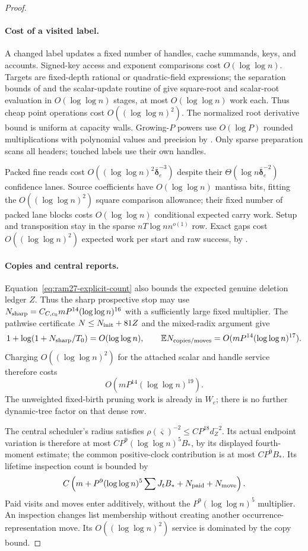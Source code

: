 \documentclass[11pt]{article}
\theoremstyle{remark}
\newcommand{\vvsbar}{\overline{\boldsymbol{\varsigma}}}
\newcommand{\ddeltabar}{\overline{\boldsymbol{\delta}}}
\newcommand{\Ex}{\mathbb E}
\begin{document}
\begin{proof}
\paragraph{Cost of a visited label.}
A changed label updates a fixed number of handles, cache summands, keys, and
accounts.
Signed-key access and exponent comparisons cost $O(\log\log n)$.
Targets are fixed-depth rational or quadratic-field expressions; the separation
bounds of  and the scalar-update routine of
 give square-root and scalar-root evaluation in $O(\log\log n)$
stages, at most $O(\log\log n)$ work each.
Thus cheap point operations cost $O((\log\log n)^2)$.
The normalized root derivative bound is uniform at capacity walls.
Growing-$P$ powers use $O(\log P)$ rounded multiplications with polynomial
values and precision by .
Only sparse preparation scans all headers; touched labels use their own handles.

Packed fine reads cost $O((\log\log n)^2\ddeltabar_e^{-3})$ despite their
$\Theta(\log n\ddeltabar_e^{-2})$ confidence lanes.
Source coefficients have $O(\log\log n)$ mantissa bits, fitting the $O((\log\log n)^2)$ square
comparison allowance; their fixed number of packed lane blocks costs $O(\log\log n)$
conditional expected carry work.
Setup and transposition stay in the sparse $nT\log nn^{o(1)}$ row.
Exact gaps cost $O((\log\log n)^2)$ expected work per start and raw success, by
.

\paragraph{Copies and central reports.}
Equation~\eqref{eq:ram27-explicit-count} also bounds the expected genuine
deletion ledger $Z$.
Thus the sharp prospective stop may use $N_{\rm
sharp}=C_{C,c_0}mP^{14}(\log\log n)^{16}$ with a sufficiently large fixed multiplier.
The pathwise certificate $N\le N_{\rm init}+81Z$ and the mixed-radix argument
give
\[
 1+\log(1+N_{\rm sharp}/T_0)=O(\log\log n),\qquad
 \Ex N_{\rm copies/moves}=O(mP^{14}(\log\log n)^{17}).
\]
Charging $O((\log\log n)^2)$ for the attached scalar and handle service
therefore costs
\[
O(mP^{14}(\log\log n)^{19}).
\]
The unweighted fixed-birth pruning work is already in $W_e$; there is no further
dynamic-tree factor on that dense row.

The central scheduler's radius satisfies $\rho(\vvsbar)^{-2}\le CP^{18}d_Z^{-2}$.
Its actual endpoint variation is therefore at most $CP^9(\log\log n)^5B_*$, by its
displayed fourth-moment estimate; the common positive-clock contribution is at
most $CP^9B_*$.
Its lifetime inspection count is bounded by
\[
 C\left(m+P^9(\log\log n)^5\sum J_tB_*+N_{\rm paid}+N_{\rm move}\right).
\]
Paid visits and moves enter additively, without the $P^9(\log\log n)^5$ multiplier.
An inspection changes list membership without creating another
occurrence-representation move.
Its $O((\log\log n)^2)$ service is dominated by the copy bound.


\end{proof}
\end{document}
